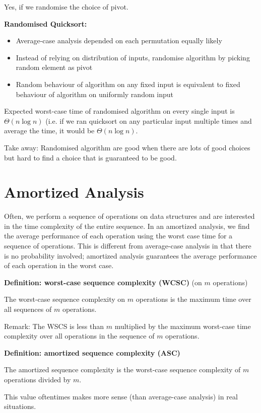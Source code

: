 \documentclass[11pt]{article}
\begin{document}
Yes, if we randomise the choice of pivot. 

\textbf{Randomised Quicksort:}
\begin{itemize}
    \item Average-case analysis depended on each permutation equally likely
    \item Instead of relying on distribution of inputs, randomise algorithm by picking random element as pivot
    \item Random behaviour of algorithm on any fixed input is equivalent to fixed behaviour of algorithm on uniformly random input
\end{itemize}
Expected worst-case time of randomised algorithm on every single input is $\Theta(n \log n)$ (i.e. if we ran quicksort on any particular input multiple times and average the time, it would be $\Theta(n \log n)$. 

Take away: Randomised algorithm are good when there are lots of good choices but hard to find a choice that is guaranteed to be good. 

\newpage 
\section{Amortized Analysis}

Often, we perform a sequence of operations on data structures and are interested in the time complexity of the entire sequence. In an amortized analysis, we find the average performance of each operation using the worst case time for a sequence of operations. This is different from average-case analysis in that there is no probability involved; amortized analysis guarantees the average performance of each operation in the worst case.

\textbf{Definition: worst-case sequence complexity (WCSC)} (on $m$ operations)

The worst-case sequence complexity on $m$ operations is the maximum time over all sequences of $m$ operations. 

Remark: The WSCS is less than $m$ multiplied by the maximum worst-case time complexity over all operations in the sequence of $m$ operations. 

\textbf{Definition: amortized sequence complexity (ASC)}

The amortized sequence complexity is the worst-case sequence complexity of $m$ operations divided by $m$. 

This value oftentimes makes more sense (than average-case analysis) in real situations. 
\end{document}
